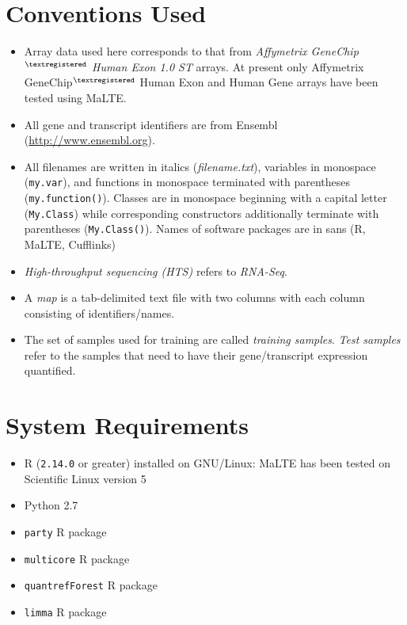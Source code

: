 \documentclass[a4paper,12pt]{article}
\begin{document}
\section{Conventions Used}
\label{conventions}
\begin{itemize}
\item Array data used here corresponds to that from \textit{Affymetrix GeneChip$^{\textregistered}$ Human Exon 1.0 ST} arrays. At present only Affymetrix GeneChip$^{\textregistered}$ Human Exon and Human Gene arrays have been tested using \textsf{MaLTE}.
\item All gene and transcript identifiers are from Ensembl (\url{http://www.ensembl.org}).
\item All filenames are written in italics (\textit{filename.txt}), variables in monospace (\texttt{my.var}), and functions in monospace terminated with parentheses (\texttt{my.function()}). Classes are in monospace beginning with a capital letter (\texttt{My.Class}) while corresponding constructors additionally terminate with parentheses (\texttt{My.Class()}). Names of software packages are in sans (\textsf{R}, \textsf{MaLTE}, \textsf{Cufflinks})
\item \textit{High-throughput sequencing (HTS)} refers to \textit{RNA-Seq}.
\item A \textit{map} is a tab-delimited text file with two columns with each column consisting of identifiers/names.
\item The set of samples used for training are called \textit{training samples}. \textit{Test samples} refer to the samples that need to have their gene/transcript expression quantified.
\end{itemize}

\section{System Requirements}
\label{system}
\begin{itemize}
\item \textsf{R} (\texttt{2.14.0} or greater) installed on GNU/Linux: \textsf{MaLTE} has been tested on Scientific Linux version 5
\item \textsf{Python} 2.7
\item \texttt{party} \textsf{R} package
\item \texttt{multicore} \textsf{R} package
\item \texttt{quantrefForest} \textsf{R} package
\item \texttt{limma} \textsf{R} package
\end{itemize}
\end{document}
